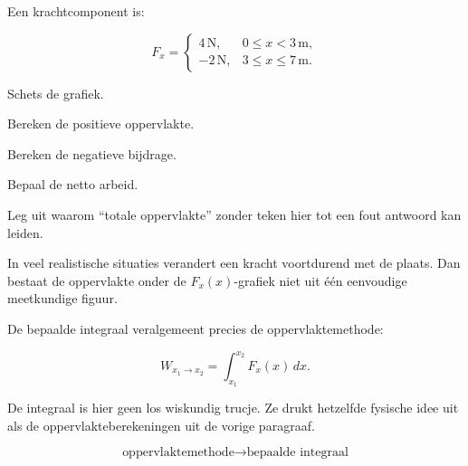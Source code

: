 \documentclass{ximera}
\begin{document}
\begin{oefening}{\oefU\ESS}

Een krachtcomponent is:

\[
F_x=
\begin{cases}
4\,\mathrm N, & 0\leq x<3\,\mathrm m,\\
-2\,\mathrm N, & 3\leq x\leq7\,\mathrm m.
\end{cases}
\]

\begin{question}
Schets de grafiek.
\end{question}

\begin{question}
Bereken de positieve oppervlakte.
\end{question}

\begin{question}
Bereken de negatieve bijdrage.
\end{question}

\begin{question}
Bepaal de netto arbeid.
\end{question}

\begin{question}
Leg uit waarom ``totale oppervlakte'' zonder teken hier tot een fout antwoord
kan leiden.
\end{question}

\end{oefening}



In veel realistische situaties verandert een kracht voortdurend met de plaats.
Dan bestaat de oppervlakte onder de $F_x(x)$-grafiek niet uit één eenvoudige
meetkundige figuur.

De bepaalde integraal veralgemeent precies de oppervlaktemethode:

\[
\boxed{
W_{x_1\rightarrow x_2}
=
\int_{x_1}^{x_2}F_x(x)\,dx.
}
\]

De integraal is hier geen los wiskundig trucje. Ze drukt hetzelfde fysische
idee uit als de oppervlakteberekeningen uit de vorige paragraaf.

\begin{center}
\[
\boxed{
\text{oppervlaktemethode}
\longrightarrow
\text{bepaalde integraal}
}
\]
\end{center}
\end{document}
